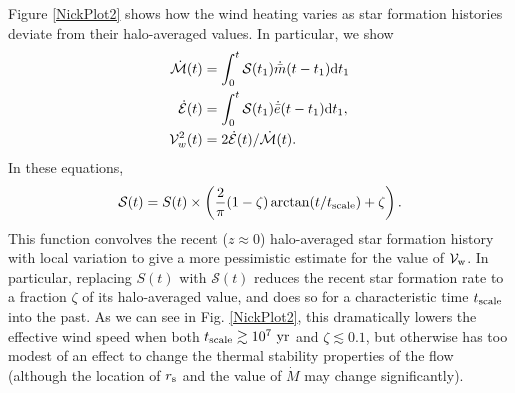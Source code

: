 Figure \ref{NickPlot2} shows how the wind heating varies as star formation histories deviate from their halo-averaged values.  In particular, we show
\begin{align} 
  \dot{\mathcal{M}}(t) &= \int_0^t \mathcal{S}(t_1) \dot{\bar{m}}(t-t_1){\rm
      d}t_1\\
  \dot{\mathcal{E}}(t) &= \int_0^t \mathcal{S}(t_1) \dot{\bar{e}}(t-t_1){\rm
      d}t_1,\\
  \mathcal{V}_w^2(t) &=2 \dot{\mathcal{E}}(t)/\dot{\mathcal{M}}(t).
\end{align}
In these equations, 
\begin{equation}
\mathcal{S}(t) = S(t) \times \left(\frac{2}{\pi}(1-\zeta)\arctan(t/t_{\rm scale}) + \zeta \right).
\end{equation}
This function convolves the recent ($z \approx 0$) halo-averaged star formation history with local variation to give a more pessimistic estimate for the value of $\mathcal{V}_{\rm w}$.  In particular, replacing $S(t)$ with $\mathcal{S}(t)$ reduces the recent star formation rate to a fraction $\zeta$ of its halo-averaged value, and does so for a characteristic time $t_{\rm scale}$ into the past.  As we can see in Fig. \ref{NickPlot2}, this dramatically lowers the effective wind speed when both $t_{\rm scale} \gtrsim 10^7 ~{\rm yr}$ and $\zeta \lesssim 0.1$, but otherwise has too modest of an effect to change the thermal stability properties of the flow (although the location of $r_{\rm s}$ and the value of $\dot{M}$ may change significantly).


